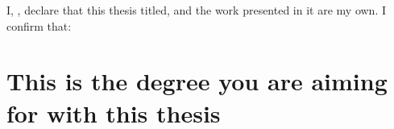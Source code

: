 \documentclass[
11pt, %
oneside, %
english, %
singlespacing, %
]{macthesis} %
\begin{document}
\listoffigures %

\listoftables %



\begin{declaration}
\addchaptertocentry{\authorshipname}

\noindent I, \authorname, declare that this thesis titled, \emph{\ttitle} and the work presented in it are my own. I confirm that:



\end{declaration}


\label{lastoffront}
\clearpage


\mainmatter %
\pagestyle{thesis}
\hypertarget{this-is-the-degree-you-are-aiming-for-with-this-thesis}{%
\chapter{This is the degree you are aiming for with this thesis}\label{this-is-the-degree-you-are-aiming-for-with-this-thesis}}
\end{document}
